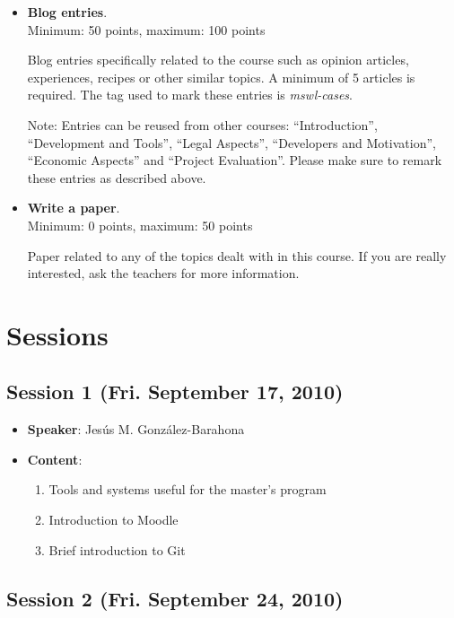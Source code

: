 \documentclass[a4paper]{article}
\begin{document}
\begin{itemize}

\item \textbf{Blog entries}. \\
  Minimum: 50 points, maximum: 100 points

  Blog entries specifically related to the course such as opinion articles, experiences, 
recipes or other similar topics. A minimum of 5 articles is required. The tag used to mark
these entries is \textit{mswl-cases}.

 Note: Entries can be reused from other courses: ``Introduction'', ``Development and Tools'',
``Legal Aspects'', ``Developers and Motivation'', ``Economic Aspects'' and ``Project Evaluation''. 
Please make sure to remark these entries as described above.

\item \textbf{Write a paper}. \\
  Minimum: 0 points, maximum: 50 points

  Paper related to any of the topics dealt with in this course. If you are really interested, ask the teachers for more information.

\end{itemize}


\section{Sessions}

\subsection{Session 1 (Fri. September 17, 2010)}

\begin{itemize}
 \item \textbf{Speaker}: Jesús M. González-Barahona

 \item \textbf{Content}:

  \begin{enumerate}
   \item Tools and systems useful for the master's program
   \item Introduction to Moodle
   \item Brief introduction to Git
  \end{enumerate}

\end{itemize}

\subsection{Session 2 (Fri. September 24, 2010)}
\end{document}
